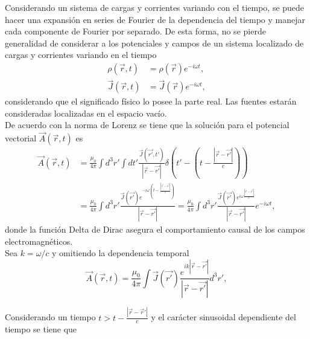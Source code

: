 Considerando un sistema de cargas y corrientes variando con el tiempo, se puede hacer una expansión en series de Fourier de la dependencia del tiempo y manejar cada componente de Fourier por separado. De esta forma, no se pierde generalidad de considerar a los potenciales y campos de un sistema localizado de cargas y corrientes variando en el tiempo \cite{Jackson}
\begin{align*}
    \rho(\Vec{r},t)&=\rho(\Vec{r})e^{-i\omega t},\\
    \Vec{J}(\Vec{r},t)&=\Vec{J}(\Vec{r})e^{-i\omega t},
\end{align*}
considerando que el significado físico lo posee la parte real. Las fuentes estarán consideradas localizadas en el espacio vacío.\\

De acuerdo con la norma de Lorenz se tiene que la solución para el potencial vectorial $\Vec{A}(\Vec{r},t)$ es \cite{Jackson}
\begin{align}
  \Vec{A}(\Vec{r},t)&=\frac{\mu_0}{4\pi}\int d^3r'\int dt'\frac{\Vec{J}(\Vec{r'},t')}{|\Vec{r}-\Vec{r'}|}\delta\left(t'-\left(t-\frac{|\Vec{r}-\Vec{r'}|}{c}\right)\right)\nonumber\\
  &=\frac{\mu_0}{4\pi}\int d^3r'\frac{\Vec{J}(\Vec{r'})e^{-i\omega \left(t-\frac{|\Vec{r}-\Vec{r'}|}{c}\right)}}{|\Vec{r}-\Vec{r'}|}=\frac{\mu_0}{4\pi}\int d^3r'\frac{\Vec{J}(\Vec{r'})e^{i\omega \frac{|\Vec{r}-\Vec{r'}|}{c}}}{|\Vec{r}-\Vec{r'}|}e^{-i\omega t},
\end{align}
donde la función Delta de Dirac asegura el comportamiento causal de los campos electromagnéticos.\\

Sea $k=\omega/c$ y omitiendo la dependencia temporal
\begin{equation}
    \Vec{A}(\Vec{r},t)=\frac{\mu_0}{4\pi}\int \Vec{J}(\Vec{r'})\frac{e^{ik|\Vec{r}-\Vec{r'}|}}{|\Vec{r}-\Vec{r'}|} d^3r',
    \label{pot_vectorial}
\end{equation} 

Considerando un tiempo $t>t-\frac{|\Vec{r}-\Vec{r}'|}{c}$ y el carácter sinusoidal dependiente del tiempo se tiene que

